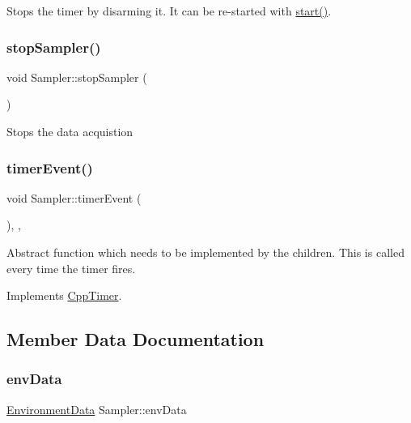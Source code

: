 Stops the timer by disarming it. It can be re-\/started with \hyperlink{classCppTimer_a64989025caa3c030c6c397ca76a2d20b}{start()}. \mbox{\label{classSampler_af661f48134a6d0f1f2d6080f5025392e}} 
\subsubsection{\texorpdfstring{stop\+Sampler()}{stopSampler()}}
{\footnotesize\ttfamily void Sampler\+::stop\+Sampler (\begin{DoxyParamCaption}{ }\end{DoxyParamCaption})\hspace{0.3cm}{\ttfamily [inline]}}

Stops the data acquistion \mbox{\label{classSampler_addf333c6e247ee3a1def41260caa902a}} 
\subsubsection{\texorpdfstring{timer\+Event()}{timerEvent()}}
{\footnotesize\ttfamily void Sampler\+::timer\+Event (\begin{DoxyParamCaption}{ }\end{DoxyParamCaption})\hspace{0.3cm}{\ttfamily [inline]}, {\ttfamily [private]}, {\ttfamily [virtual]}}

Abstract function which needs to be implemented by the children. This is called every time the timer fires. 

Implements \hyperlink{classCppTimer_ac2665403595b6aee5f581d0ebfeb886c}{Cpp\+Timer}.



\subsection{Member Data Documentation}
\mbox{\label{classSampler_a4cfbeb66e1cd18cfc66ccdb2712770f9}} 
\subsubsection{\texorpdfstring{env\+Data}{envData}}
{\footnotesize\ttfamily \hyperlink{structEnvironmentData}{Environment\+Data} Sampler\+::env\+Data\hspace{0.3cm}{\ttfamily [private]}}

